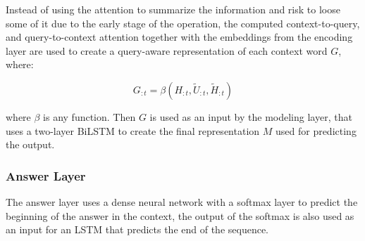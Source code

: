 

Instead of using the attention to summarize the information and risk to loose some of it due to the early stage of the operation, the computed context-to-query, and query-to-context attention together with the embeddings from the encoding layer are used to create a query-aware representation of each context word $G$, where:

\begin{equation}
    G_{:t} = \beta(H_{:t}, \tilde{U}_{:t}, \tilde{H}_{:t})
\end{equation}

where $\beta$ is any function. Then $G$ is used as an input by the modeling layer, that uses a two-layer BiLSTM to create the final representation $M$ used for predicting the output.


\subsubsection{Answer Layer}
The answer layer uses a dense neural network with a softmax layer to predict the beginning of the answer in the context, the output of the softmax is also used as an input for an LSTM that predicts the end of the sequence. 

